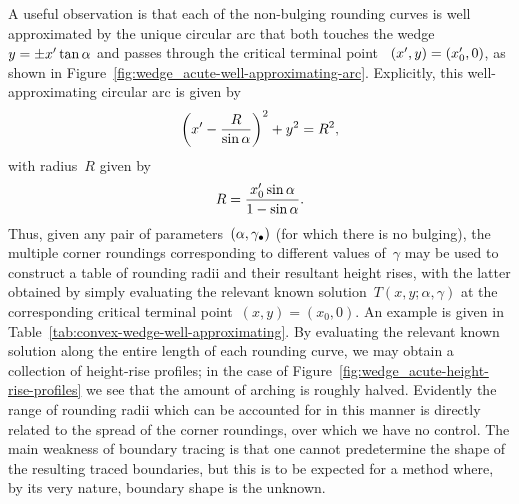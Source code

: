 A useful observation is that
each of the non-bulging rounding curves is well approximated
by the unique circular arc
that both touches the wedge~$y = \pm x' \tan\alpha$
and passes through the critical terminal point~%
  $(x', y) = (x'_0, 0)$,
as shown in Figure~\ref{fig:wedge_acute-well-approximating-arc}.
Explicitly, this well-approximating circular arc is given by
\begin{equation}
  \roundbr*{\offset{x} - \frac{R}{\sin\alpha}}^2 + y^2 = R^2,
  \label{eq:moderate-well-approximating-rounding-circle}
\end{equation}
with radius~$R$ given by
\begin{equation}
  R = \frac{\offset{x}_0 \sin\alpha}{1 - \sin\alpha}.
  \label{eq:moderate-well-approximating-rounding-radius}
\end{equation}
Thus, given any pair of parameters~$(\alpha, \gamma_\bullet)$
(for which there is no bulging),
the multiple corner roundings corresponding to different values of~$\gamma$
may be used to construct a table of rounding radii
and their resultant height rises,
with the latter obtained by simply
evaluating the relevant known solution~$T (x, y; \alpha, \gamma)$
at the corresponding critical terminal point~$(x, y) = (x_0, 0)$.
An example is given in Table~\ref{tab:convex-wedge-well-approximating}.
By evaluating the relevant known solution
along the entire length of each rounding curve,
we may obtain a collection of height-rise profiles;
in the case of Figure~\ref{fig:wedge_acute-height-rise-profiles}
we see that the amount of arching is roughly halved.
Evidently the range of rounding radii
which can be accounted for in this manner
is directly related to the spread of the corner roundings,
over which we have no control.
The main weakness of boundary tracing is that
one cannot predetermine the shape of the resulting traced boundaries,
but this is to be expected for a method where,
by its very nature,
boundary shape is the unknown.

